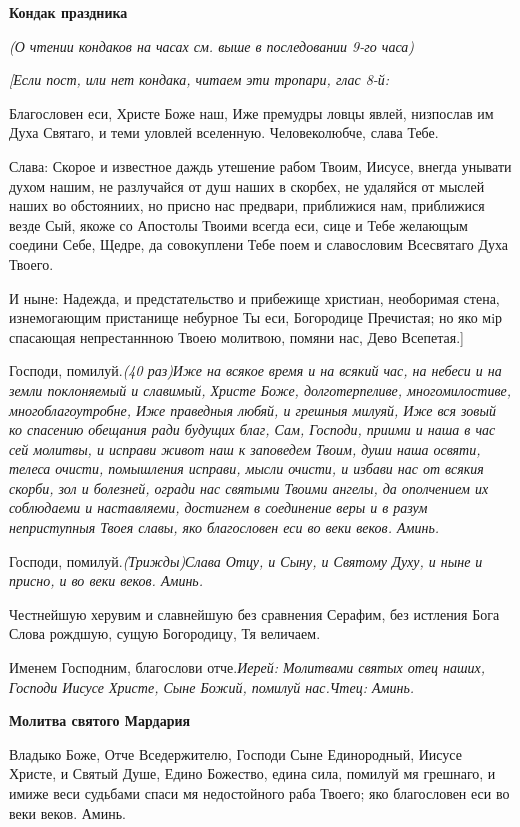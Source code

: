 \medskip
\bfseries Кондак праздника\normalfont{}\nopagebreak

\itshape (О чтении кондаков на часах см. выше в последовании 9-го час\normalfont{}а)

\itshape [Если пост, или нет кондака, читаем эти тропари, глас 8-\normalfont{}й:

Благословен еси, Христе Боже наш, Иже премудры ловцы явлей, низпослав им Духа Святаго, и теми уловлей вселенную. Человеколюбче, слава Тебе.

Слава: Скорое и известное даждь утешение рабом Твоим, Иисусе, внегда унывати духом нашим, не разлучайся от душ наших в скорбех, не удаляйся от мыслей наших во обстояниих, но присно нас предвари, приближися нам, приближися везде Сый, якоже со Апостолы Твоими всегда еси, сице и Тебе желающым соедини Себе, Щедре, да совокуплени Тебе поем и славословим Всесвятаго Духа Твоего.

И ныне: Надежда, и предстательство и прибежище христиан, необоримая стена, изнемогающим пристанище небурное Ты еси, Богородице Пречистая; но яко мiр спасающая непрестаннною Твоею молитвою, помяни нас, Дево Всепетая.]

Господи, помилуй.\itshape  (40 раз)\normalfont{}Иже на всякое время и на всякий час, на небеси и на земли поклоняемый и славимый, Христе Боже, долготерпеливе, многомилостиве, многоблагоутробне, Иже праведныя любяй, и грешныя милуяй, Иже вся зовый ко спасению обещания ради будущих благ, Сам, Господи, приими и наша в час сей молитвы, и исправи живот наш к заповедем Твоим, души наша освяти, телеса очисти, помышления исправи, мысли очисти, и избави нас от всякия скорби, зол и болезней, огради нас святыми Твоими ангелы, да ополчением их соблюдаеми и наставляеми, достигнем в соединение веры и в разум неприступныя Твоея славы, яко благословен еси во веки веков. Аминь.

Господи, помилуй.\itshape  (Трижды)\normalfont{}Слава Отцу, и Сыну, и Святому Духу, и ныне и присно, и во веки веков. Аминь.

Честнейшую херувим и славнейшую без сравнения Серафим, без истления Бога Слова рождшую, сущую Богородицу, Тя величаем.

Именем Господним, благослови отче.\itshape Иерей\normalfont{}: Молитвами святых отец наших, Господи Иисусе Христе, Сыне Божий, помилуй нас.\itshape Чтец\normalfont{}: Аминь.


\medskip
\bfseries Молитва святого Мардария\normalfont{}\nopagebreak

Владыко Боже, Отче Вседержителю, Господи Сыне Единородный, Иисусе Христе, и Святый Душе, Едино Божество, едина сила, помилуй мя грешнаго, и имиже веси судьбами спаси мя недостойного раба Твоего; яко благословен еси во веки веков. Аминь.

\bigskip\bigskip\mychapterending